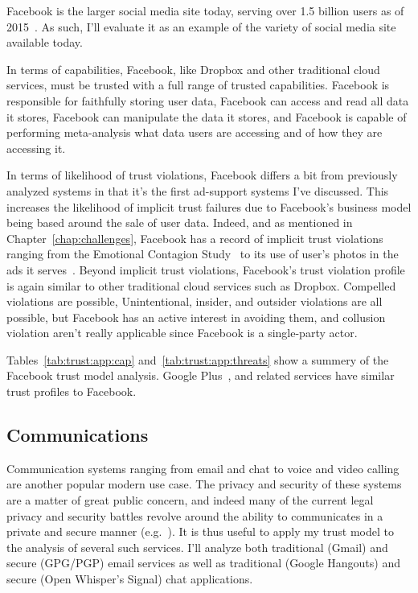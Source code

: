 Facebook is the larger social media site today, serving over 1.5
billion users as of 2015~\cite{foster2014}. As such, I'll evaluate it
as an example of the variety of social media site available today.

In terms of capabilities, Facebook, like Dropbox and other traditional
cloud services, must be trusted with a full range of trusted
capabilities. Facebook is responsible for faithfully storing user
data, Facebook can access and read all data it stores, Facebook can
manipulate the data it stores, and Facebook is capable of performing
meta-analysis what data users are accessing and of how they are
accessing it.

In terms of likelihood of trust violations, Facebook differs a bit
from previously analyzed systems in that it's the first ad-support
systems I've discussed. This increases the likelihood of implicit
trust failures due to Facebook's business model being based around the
sale of user data. Indeed, and as mentioned in
Chapter~\ref{chap:challenges}, Facebook has a record of implicit trust
violations ranging from the Emotional Contagion Study~\cite{goel2014}
to its use of user's photos in the ads it
serves~\cite{mashable-socialads}. Beyond implicit trust violations,
Facebook's trust violation profile is again similar to other
traditional cloud services such as Dropbox. Compelled violations are
possible, Unintentional, insider, and outsider violations are all
possible, but Facebook has an active interest in avoiding them, and
collusion violation aren't really applicable since Facebook is a
single-party actor.

Tables~\ref{tab:trust:app:cap} and~\ref{tab:trust:app:threats} show a
summery of the Facebook trust model analysis. Google
Plus~\cite{google-plus}, and related services have similar trust
profiles to Facebook.

\subsection{Communications}

Communication systems ranging from email and chat to voice and video
calling are another popular modern use case. The privacy and security
of these systems are a matter of great public concern, and indeed many
of the current legal privacy and security battles revolve around the
ability to communicates in a private and secure manner
(e.g.~\cite{apple-fbiletter, greenwald-prism, levsion-lavabit}). It is
thus useful to apply my trust model to the analysis of several such
services. I'll analyze both traditional (Gmail) and secure (GPG/PGP)
email services as well as traditional (Google Hangouts) and secure
(Open Whisper's Signal) chat applications.

